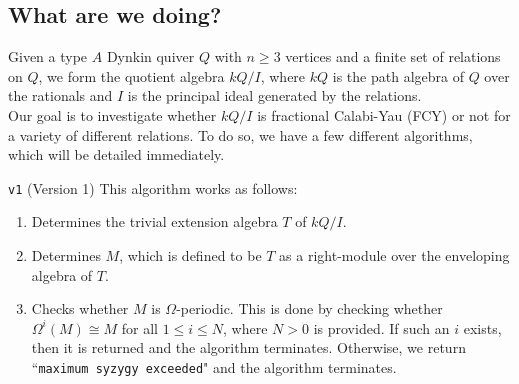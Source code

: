 \documentclass{article}
\begin{document}
\iffalse
\begin{flushleft}
   \begin{center}
   \end{center}

   \subsection*{What are we doing?}
   Given a type $A$ Dynkin quiver $Q$ with $n \geq 3$ vertices and a finite set of relations on $Q$, 
   we form the quotient algebra $kQ/I$, where $kQ$ is the path algebra of $Q$ over the rationals and $I$ 
   is the principal ideal generated by the relations. \\[\baselineskip]

   Our goal is to investigate whether $kQ/I$ is fractional Calabi-Yau (FCY) or not for a variety of different relations.
   To do so, we have a few different algorithms, which will be detailed immediately. \\[\baselineskip]

   \begin{coolbox}{\texttt{v1} (Version 1)}
      This algorithm works as follows:
      \begin{enumerate}[label=\textbf{(\roman*)}]
         \item Determines the trivial extension algebra $T$ of $kQ/I$.
         \item Determines $M$, which is defined to be $T$ as a right-module over the enveloping algebra of $T$.
         \item Checks whether $M$ is $\Omega$-periodic. This is done by checking whether $\Omega^i\left(M\right) \cong M$
            for all $1 \leq i \leq N$, where $N > 0$ is provided. If such an $i$ exists, then it is returned and the algorithm
            terminates. Otherwise, we return ``\texttt{maximum syzygy exceeded}" and the algorithm terminates. 
      \end{enumerate}
   \end{coolbox}


\end{flushleft}
\end{document}
